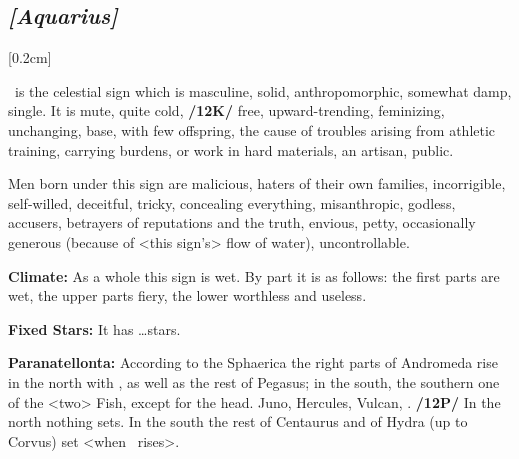 \subsection{\textit{[Aquarius]}}
[0.2cm]

 \Aquarius\, is the celestial sign which is  masculine,  solid,  anthropomorphic, somewhat damp, single. It is  mute, quite cold, \textbf{/12K/} free, upward-trending, feminizing, unchanging, base, with few offspring, the cause of troubles arising from athletic training, carrying burdens, or work in hard materials, an artisan, public. 

Men born under this sign are malicious, haters of their own families, incorrigible, self-willed, deceitful, tricky, concealing everything, misanthropic, godless, accusers, betrayers of reputations and the truth, envious, petty, occasionally generous (because of <this sign’s> flow of water), uncontrollable.

\textbf{Climate:} As a whole this sign is wet. By part it is as follows: the first parts are wet, the upper parts fiery, the lower worthless and useless. 

\textbf{Fixed Stars:} It has …stars. 

\textbf{Paranatellonta:} According to the Sphaerica the right parts of Andromeda rise in the north with \Aquarius, as well as the rest of Pegasus; in the south, the southern one of the <two> Fish, except for the head. Juno, Hercules, Vulcan, \Saturn. \textbf{/12P/} In the north nothing sets. In the south
the rest of Centaurus and of Hydra (up to Corvus) set <when \Aquarius\, rises>. 

